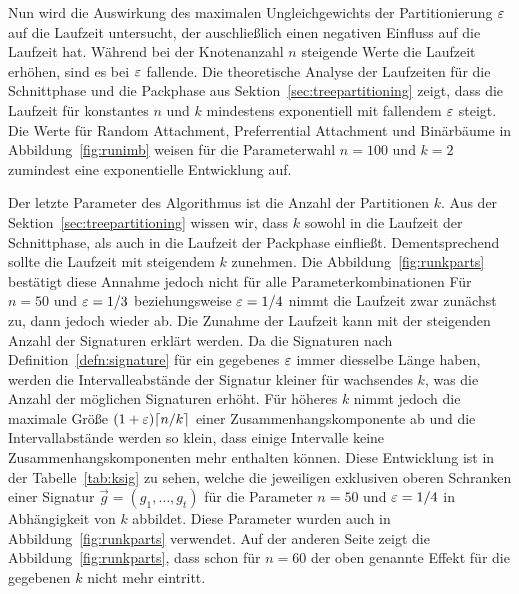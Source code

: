 Nun wird die Auswirkung des maximalen Ungleichgewichts der Partitionierung $\varepsilon$ auf die Laufzeit untersucht, der auschließlich einen negativen Einfluss auf die Laufzeit hat.
Während bei der Knotenanzahl $n$ steigende Werte die Laufzeit erhöhen, sind es bei $\varepsilon$ fallende.
Die theoretische Analyse der Laufzeiten für die Schnittphase und die Packphase aus Sektion~\ref{sec:treepartitioning} zeigt, dass die Laufzeit für konstantes $n$ und $k$ mindestens exponentiell mit fallendem $\varepsilon$ steigt.
 Die Werte für Random Attachment, Preferrential Attachment und Binärbäume in Abbildung~\ref{fig:runimb} weisen für die Parameterwahl $n = 100$ und $k = 2$ zumindest eine exponentielle Entwicklung auf.

Der letzte Parameter des Algorithmus ist die Anzahl der Partitionen $k$. 
Aus der Sektion~\ref{sec:treepartitioning} wissen wir, dass $k$ sowohl in die Laufzeit der Schnittphase, als auch in die Laufzeit der Packphase einfließt.
Dementsprechend sollte die Laufzeit mit steigendem $k$ zunehmen.
Die Abbildung~\ref{fig:runkparts} bestätigt diese Annahme jedoch nicht für alle Parameterkombinationen
Für $n=50$ und $\varepsilon=1/3$ beziehungsweise $\varepsilon=1/4$ nimmt die Laufzeit zwar zunächst zu, dann jedoch wieder ab.
Die Zunahme der Laufzeit kann mit der steigenden Anzahl der Signaturen erklärt werden.
Da die Signaturen nach Definition~\ref{defn:signature} für ein gegebenes $\varepsilon$ immer diesselbe Länge haben, werden die Intervalleabstände der Signatur kleiner für wachsendes $k$, was die Anzahl der möglichen Signaturen erhöht.
Für höheres $k$ nimmt jedoch die maximale Größe $(1 + \varepsilon) \lceil n/k\rceil$ einer Zusammenhangskomponente ab und die Intervallabstände werden so klein, dass einige Intervalle keine Zusammenhangskomponenten mehr enthalten können. 
Diese Entwicklung ist in der Tabelle~\ref{tab:ksig} zu sehen, welche die jeweiligen exklusiven oberen Schranken einer Signatur $\vec{g} = (g_1, \ldots, g_t)$ für die Parameter $n = 50$ und $\varepsilon = 1/4$ in Abhängigkeit von $k$ abbildet.
Diese Parameter wurden auch in Abbildung~\ref{fig:runkparts} verwendet.
Auf der anderen Seite zeigt die Abbildung~\ref{fig:runkparts}, dass schon für $n=60$ der oben genannte Effekt für die gegebenen $k$ nicht mehr eintritt. 


